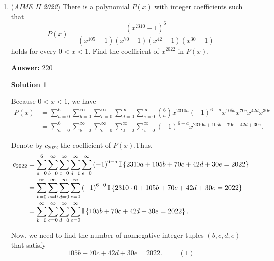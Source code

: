 \begin{enumerate}
 The distance between $\left( - 4 , 0 \right)$ and $\left( 20 , 10 \right)$ is $\sqrt{\left( 20 + 4 \right)^2 + \left( 10 - 0 \right)^2} = 26$.

 The distance between $\left( 4 , 0 \right)$ and $\left( 20 , 12 \right)$ is $\sqrt{\left( 20 - 4 \right)^2 + \left( 12 - 0 \right)^2} = 20$.

 Hence, $2 a + 2 b = 26 + 20 = 46$.

 Therefore, $a + b = \boxed{\textbf{(023) }}.$



	\item (\textit{AIME II 2022}) There is a polynomial $P(x)$ with integer coefficients such that
 \[P(x)=\frac{(x^{2310}-1)^6}{(x^{105}-1)(x^{70}-1)(x^{42}-1)(x^{30}-1)}\]holds for every $0<x<1.$ Find the coefficient of $x^{2022}$ in $P(x)$.


 
 \textbf{Answer: }220



\textbf{Solution 1}

Because $0 < x < 1$, we have
 \begin{align*} P \left( x \right) & = \sum_{a=0}^6  \sum_{b=0}^\infty \sum_{c=0}^\infty \sum_{d=0}^\infty \sum_{e=0}^\infty \binom{6}{a} x^{2310a} \left( - 1 \right)^{6-a} x^{105b} x^{70c} x^{42d} x^{30e} \\ & = \sum_{a=0}^6 \sum_{b=0}^\infty \sum_{c=0}^\infty \sum_{d=0}^\infty \sum_{e=0}^\infty \left( - 1 \right)^{6-a} x^{2310 a + 105 b + 70 c + 42 d + 30 e} . \end{align*}


 Denote by $c_{2022}$ the coefficient of $P \left( x \right)$.Thus,
 \begin{align*} c_{2022} & = \sum_{a=0}^6 \sum_{b=0}^\infty \sum_{c=0}^\infty \sum_{d=0}^\infty \sum_{e=0}^\infty \left( - 1 \right)^{6-a} \Bbb I \left\{ 2310 a + 105 b + 70 c + 42 d + 30 e = 2022 \right\} \\ & =  \sum_{b=0}^\infty \sum_{c=0}^\infty \sum_{d=0}^\infty \sum_{e=0}^\infty \left( - 1 \right)^{6-0} \Bbb I \left\{ 2310 \cdot 0 + 105 b + 70 c + 42 d + 30 e = 2022 \right\} \\ & = \sum_{b=0}^\infty \sum_{c=0}^\infty \sum_{d=0}^\infty \sum_{e=0}^\infty \Bbb I \left\{ 105 b + 70 c + 42 d + 30 e = 2022 \right\} . \end{align*}


 Now, we need to find the number of nonnegative integer tuples $\left( b , c , d , e \right)$ that satisfy 
 \[ 105 b + 70 c + 42 d + 30 e = 2022 . \hspace{1cm} (1) \]


\end{enumerate}
